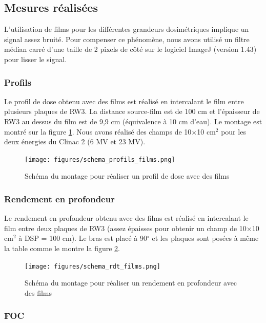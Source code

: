 \documentclass{book}
\begin{document}
\subsection{Mesures réalisées}

L'utilisation de films pour les différentes grandeurs dosimétriques implique un signal assez bruité. Pour compenser ce phénomène, nous avons utilisé un filtre médian carré d'une taille de 2 pixels de côté sur le logiciel ImageJ (version 1.43) pour lisser le signal.

\subsubsection{Profils}

Le profil de dose obtenu avec des films est réalisé en intercalant le film entre plusieurs plaques de RW3. La distance source-film est de 100 cm et l'épaisseur de RW3 au dessus du film est de 9,9 cm (équivalence à 10 cm d'eau). Le montage est montré sur la figure \ref*{fig_schema_profils_films}. Nous avons réalisé des champs de 10$\times$10 cm$^2$ pour les deux énergies du Clinac 2 (6 MV et 23 MV).

\begin{figure}[h]
  \centering
  \texttt{[image: figures/schema\_profils\_films.png]}
  \caption{Schéma du montage pour réaliser un profil de dose avec des films}
  \label{fig_schema_profils_films}
\end{figure}

\subsubsection{Rendement en profondeur}

Le rendement en profondeur obtenu avec des films est réalisé en intercalant le film entre deux plaques de RW3 (assez épaisses pour obtenir un champ de 10$\times$10 cm$^2$ à DSP = 100 cm). Le bras est placé à 90$^{\circ}$ et les plaques sont posées à même la table comme le montre la figure \ref*{fig_schema_rdt_films}.

\begin{figure}[h]
  \centering
  \texttt{[image: figures/schema\_rdt\_films.png]}
  \caption{Schéma du montage pour réaliser un rendement en profondeur avec des films}
  \label{fig_schema_rdt_films}
\end{figure}

\subsubsection{FOC}
\end{document}
